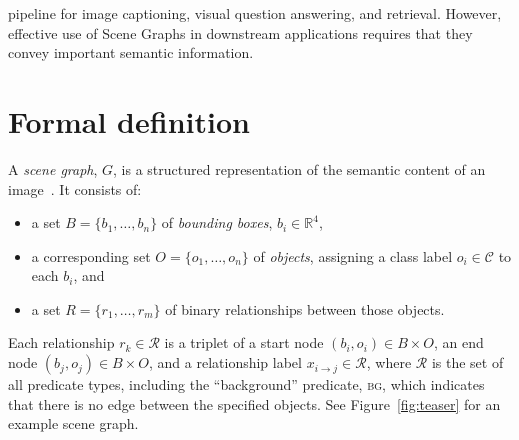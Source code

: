 \documentclass[10pt,twocolumn,letterpaper]{article}
\DeclareMathOperator*{\argmax}{argmax}
\newcommand{\authcomment}[3]{\textcolor{#1}{#2:[#3]}}
\newcommand{\rowan}[1]{{\color{red}rz:[#1]}}
\newcommand{\sam}[1]{\authcomment{blue}{sam}{#1}}
\newcommand{\bg}{\textsc{bg}}  %
\newcommand{\term}[1]{\emph{#1}}  %
\begin{document}
pipeline for image captioning, visual question answering, and retrieval. However, effective use of Scene Graphs in downstream applications requires that they convey important semantic information.
\label{sec:introduction}
\section{Formal definition}
\label{sec:definition}
\vspace{-5pt}
A \term{scene graph}, $G$, is a structured representation of the semantic content of an image~\cite{johnson_image_2015}.
It consists of:
\vspace*{-1mm}\begin{itemize}
  \item a set $B = \{ b_1, \ldots, b_n \}$ of \term{bounding boxes}, %
  $b_i \in \mathbb{R}^4$,
  \vspace*{-1mm}
  \item a corresponding set $O = \{o_1, \ldots, o_n\}$ of \term{objects}, assigning a class label $o_i \in \mathcal{C}$ to each $b_i$, and
  \vspace*{-1mm}
  \item a set $R = \{r_1, \ldots, r_m\}$ of binary relationships between those objects.
\end{itemize}\vspace*{-1mm}
Each relationship $r_k \in \mathcal{R}$ is a triplet of a start node $(b_i, o_i) \in B \times O$, an end node $(b_j, o_j) \in B \times O$, and a relationship label $x_{i \to j} \in \mathcal{R}$, where $\mathcal{R}$ is the set of all predicate types, including the ``background'' predicate, \bg, which indicates that there is no edge between the specified objects.
See Figure~\ref{fig:teaser} for an example scene graph.

\label{sec:problem}
\end{document}

